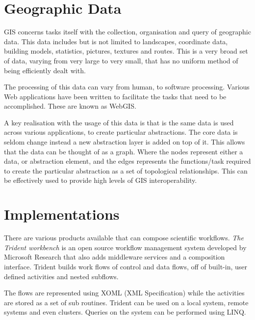 \documentclass[11pt,twocolumn]{article}
\begin{document}
\section{Geographic Data}
    GIS concerns tasks itself with the collection, organisation
    and query of geographic data. This data includes but
    is not limited to landscapes, coordinate data, building models,
    statistics, pictures, textures and routes. This
    is a very broad set of data, varying from very large to very small,
    that has no uniform method  of being efficiently dealt with.

    The processing of this data can vary from human, to software
    processing. Various Web applications have been written
    to facilitate the tasks that need to be accomplished.
    These are known as WebGIS\cite{DiMartino:2007:TAG:1341012.1341081}.

    A key realisation with the usage of this data is that
    is the same data is used across various applications,
    to create particular abstractions. The core data is
    seldom change instead a new abstraction layer is added
    on top of it. This allows that the data can be thought
    of as a graph. Where the nodes represent either a data,
    or abstraction element, and the edges represents the
    functions/task required to create the particular abstraction
    as a set of topological
    relationships. This can be effectively used to provide
    high levels of GIS
    interoperability\cite{ElAdnani:2001:MLF:512161.512177}.

\section{Implementations}
    There are various products available that can compose
    scientific workflows. \emph{The Trident workbench}
    \cite{Simmhan:2009:BTS:1673063.1673121} is an open
    source workflow management system developed by Microsoft
    Research that also adds middleware services and a
    composition interface. Trident builds work flows of control
    and data flows, off of built-in, user defined activities and
    nested subflows.

    The flows are represented using XOML (XML Specification) while
    the activities are stored as a set of sub routines. Trident
    can be used on a local system, remote systems and even clusters.
    Queries on the system can be performed using LINQ.
    \cite{Simmhan2011790}
\end{document}
